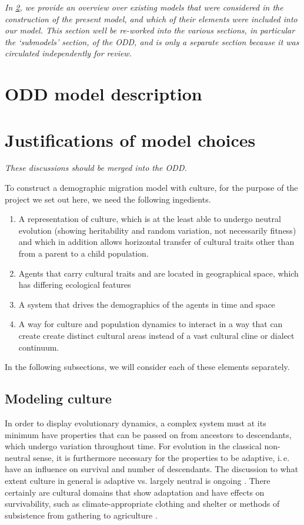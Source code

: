 \documentclass[a4paper,12pt]{scrartcl}
\begin{document}
\emph{In \cref{s:earlier}, we provide an overview over existing models that were
  considered in the construction of the present model, and which of their
  elements were included into our model. This section well be re-worked into the
  various sections, in particular the ‘submodels’ section, of the ODD, and is
  only a separate section because it was circulated independently for review.}
\section{ODD model description}
\label{s:odd}


\section{Justifications of model choices}
\label{s:earlier}

\emph{These discussions should be merged into the ODD.}

To construct a demographic migration model with culture, for the purpose of the
project we set out here, we need the following ingedients.
\begin{enumerate}
\item A representation of culture, which is at the least able to undergo neutral
  evolution (showing heritability and random variation, not necessarily
  fitness) and which in addition allows horizontal transfer of cultural traits
  other than from a parent to a child population.
\item Agents that carry cultural traits and are located in geographical space,
  which has differing ecological features
\item A system that drives the demographics of the agents in time and space
\item A way for culture and population dynamics to interact in a way that can
  create create distinct cultural areas instead of a vast cultural cline or
  dialect continuum.
\end{enumerate}

In the following subsections, we will consider each of these elements
separately.

\subsection{Modeling culture}
\label{s:culture}
In order to display evolutionary dynamics, a complex system must at its minimum
have properties that can be passed on from ancestors to descendants, which
undergo variation throughout time. For evolution in the classical non-neutral
sense, it is furthermore necessary for the properties to be adaptive, i.\,e.
have an influence on survival and number of descendants. The discussion to what
extent culture in general is adaptive vs. largely neutral is ongoing
\parencite{}. There certainly are cultural domains that show adaptation and have
effects on survivability, such as climate-appropriate clothing and shelter
\parencite{} or methods of subsistence from gathering to agriculture
\parencite{}. 
\end{document}
